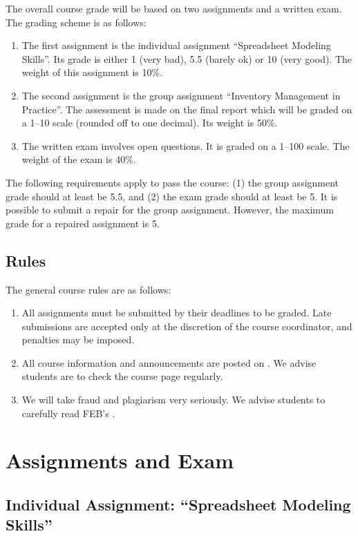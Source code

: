 \documentclass{article}
\begin{document}
The overall course grade will be based on two assignments and a written exam. The grading scheme is as follows: 
\begin{enumerate}
\item The first assignment is the individual assignment ``Spreadsheet Modeling Skills''. Its grade is either 1 (very bad), 5.5 (barely ok) or 10 (very good). The weight of this assignment is 10\%.
\item The second assignment is the group assignment ``Inventory Management in Practice''. The assessment is made on the final report which will be graded on a 1--10 scale (rounded off to one decimal). Its weight is 50\%. 
\item The written exam involves open questions. It is graded on a 1--100 scale. The weight of the exam is 40\%. 
\end{enumerate}

The following requirements apply to pass the course: (1) the group assignment grade should at least be 5.5, and (2) the exam grade should at least be 5. It is possible to submit a repair for the group assignment. However, the maximum grade for a repaired assignment is 5.

\subsection{Rules}

The general course rules are as follows:
\begin{enumerate}
\item All assignments must be submitted by their deadlines to be graded. Late submissions are accepted only at the discretion of the course coordinator, and penalties may be imposed. 
\item All course information and announcements are posted on \nestor. We advise students are to check the course page regularly.
\item We will take fraud and plagiarism very seriously. We advise students to carefully read FEB's \policy.
\end{enumerate}

 
\section{Assignments and Exam}

\subsection{Individual Assignment: ``Spreadsheet Modeling Skills''}
\label{sec:individual}
\end{document}
